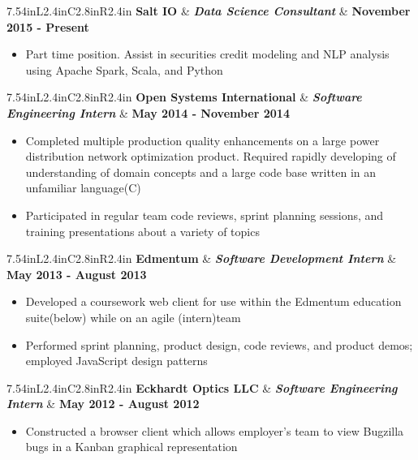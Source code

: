 \documentclass[letterpaper,10pt]{article}
\newcommand{\resitem}[1]{\item #1 

\vspace{-.1in}
}
\newcommand{\rressubheading}[3]{
\begin{tabular*}{7.54in}{L{2.4in}C{2.8in}R{2.4in}}
		\textbf{#1} & \textit{\textbf{#2}}  & \textbf{#3}
\end{tabular*}}
\begin{document}
\rressubheading{Salt IO}{Data Science Consultant}{November 2015 - Present}
\vspace{-.1in}
\begin{itemize}
	\resitem{Part time position. Assist in securities credit modeling and NLP analysis using Apache Spark, Scala, and Python}
\end{itemize}
\vspace{.1in}
\rressubheading{Open Systems International}{Software Engineering Intern}{May 2014 - November 2014}
\vspace{-.1in}
\begin{itemize}
	\resitem{Completed multiple production quality enhancements on a large power distribution network optimization product. Required rapidly developing of understanding of domain concepts and a large code base written in an unfamiliar language(C)}
	\resitem{Participated in regular team code reviews, sprint planning sessions, and training presentations about a variety of topics}
\end{itemize}
\vspace{.1in}
\rressubheading{Edmentum}{Software Development Intern}{May 2013 - August 2013}
\vspace{-.1in}
\begin{itemize}
	\resitem{Developed a coursework web client for use within the Edmentum education suite(below) while on an agile (intern)team}
	\resitem{Performed sprint planning, product design, code reviews, and product demos; employed JavaScript design patterns}
\end{itemize}
\vspace{.1in}
\rressubheading{Eckhardt Optics LLC}{Software Engineering Intern}{May 2012 - August 2012}
\vspace{-.1in}
\begin{itemize}
	\resitem{Constructed a browser client which allows employer's team to view Bugzilla bugs in a Kanban graphical representation}
\end{itemize}
\vspace{.1in}
\end{document}
